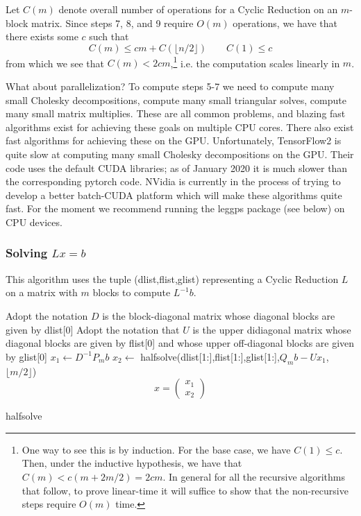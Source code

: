\documentclass{article}
\theoremstyle{definition}
\begin{document}
Let $C(m)$ denote overall number of operations for a Cyclic Reduction on an $m$-block matrix.  Since steps 7, 8, and 9 require $O(m)$ operations, we have that there exists some $c$ such that
\[
C(m) \leq cm + C(\lfloor n/2 \rfloor) \qquad C(1) \leq c
\]
from which we see that $C(m) < 2cm$,\footnote{One way to see this is by induction.  For the base case, we have $C(1)\leq c$.  Then, under the inductive hypothesis, we have that $C(m) < c(m+2m/2) = 2cm$.  In general for all the recursive algorithms that follow, to prove linear-time it will suffice to show that the non-recursive steps require $O(m)$ time.} i.e. the computation scales linearly in $m$.

What about parallelization?  To compute steps 5-7 we need to compute many small Cholesky decompositions, compute many small triangular solves, compute many small matrix multiplies.  These are all common problems, and blazing fast algorithms exist for achieving these goals on multiple CPU cores.  There also exist fast algorithms for achieving these on the GPU.  Unfortunately, TensorFlow2 is quite slow at computing many small Cholesky decompositions on the GPU.  Their code uses the default CUDA libraries; as of January 2020 it is much slower than the corresponding pytorch code.  NVidia is currently in the process of trying to develop a better batch-CUDA platform which will make these algorithms quite fast.  For the moment we recommend running the leggps package (see below) on CPU devices.  

\subsubsection{Solving $Lx=b$}

This algorithm uses the tuple (dlist,flist,glist) representing a Cyclic Reduction $L$ on a matrix with $m$ blocks to compute $L^{-1}b$.

\begin{algorithm}[H]
 Adopt the notation $D$ is the block-diagonal matrix whose diagonal blocks are given by dlist[0] \;
 Adopt the notation that $U$ is the upper didiagonal matrix whose diagonal blocks are given by flist[0] and whose upper off-diagonal blocks are given by glist[0]\;
 {
    $x_1 \gets D^{-1} P_m b$\;
    $x_2 \gets$ halfsolve(dlist[1:],flist[1:],glist[1:],$Q_m b - U x_1$,$\lfloor m/2\rfloor$)\;
    \Return 
    \[
        x=\left(\begin{array}{c}
        x_1\\
        x_2
        \end{array}\right)
    \]
 }
 \caption{halfsolve}
\end{algorithm}
\end{document}
